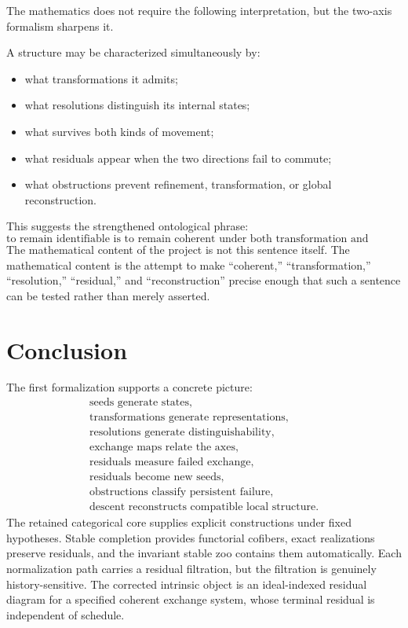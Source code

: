 \documentclass[11pt]{article}
\theoremstyle{definition}
\theoremstyle{remark}
\begin{document}
The mathematics does not require the following interpretation, but the two-axis formalism sharpens it.

A structure may be characterized simultaneously by:
\begin{itemize}
    \item what transformations it admits;
    \item what resolutions distinguish its internal states;
    \item what survives both kinds of movement;
    \item what residuals appear when the two directions fail to commute;
    \item what obstructions prevent refinement, transformation, or global reconstruction.
\end{itemize}

This suggests the strengthened ontological phrase:
\[
\boxed{
\text{to remain identifiable is to remain coherent under both transformation and resolution.}
}
\]
The mathematical content of the project is not this sentence itself. The mathematical content is the attempt to make ``coherent,'' ``transformation,'' ``resolution,'' ``residual,'' and ``reconstruction'' precise enough that such a sentence can be tested rather than merely asserted.

\section{Conclusion}

The first formalization supports a concrete picture:
\[
\boxed{
\begin{array}{c}
\text{seeds generate states},\\
\text{transformations generate representations},\\
\text{resolutions generate distinguishability},\\
\text{exchange maps relate the axes},\\
\text{residuals measure failed exchange},\\
\text{residuals become new seeds},\\
\text{obstructions classify persistent failure},\\
\text{descent reconstructs compatible local structure}.
\end{array}
}
\]
The retained categorical core supplies explicit constructions under fixed hypotheses. Stable completion provides functorial cofibers, exact realizations preserve residuals, and the invariant stable zoo contains them automatically. Each normalization path carries a residual filtration, but the filtration is genuinely history-sensitive. The corrected intrinsic object is an ideal-indexed residual diagram for a specified coherent exchange system, whose terminal residual is independent of schedule.
\end{document}
